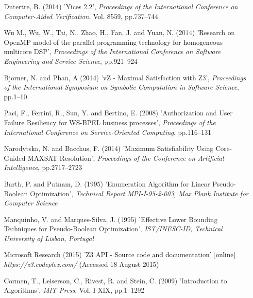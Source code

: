 \documentclass{doublecol-new}
\theoremstyle{TH}{
\newtheorem{lemma}{Lemma}
\newtheorem{theorem}[lemma]{Theorem}
\newtheorem{corrolary}[lemma]{Corrolary}
\newtheorem{conjecture}[lemma]{Conjecture}
\newtheorem{proposition}[lemma]{Proposition}
\newtheorem{claim}[lemma]{Claim}
\newtheorem{stheorem}[lemma]{Wrong Theorem}
\newtheorem{algorithm}{Algorithm}
}
\theoremstyle{THrm}{
\newtheorem{definition}{Definition}[section]
\newtheorem{question}{Question}[section]
\newtheorem{remark}{Remark}
\newtheorem{scheme}{Scheme}
}
\theoremstyle{THhit}{
\newtheorem{case}{Case}[section]
}
\begin{document}
\begin{thebibliography}{10}
Dutertre, B. (2014) 'Yices 2.2', {\it Proceedings of the International Conference on Computer-Aided Verification}, Vol. 8559, pp.737--744

Wu M., Wu, W., Tai, N., Zhao, H., Fan, J. and Yuan, N. (2014) 'Research on OpenMP model of the parallel programming technology for homogeneous multicore DSP', {\it Proceedings of the International Conference on Software Engineering and Service Science}, pp.921--924

Bjorner, N. and Phan, A (2014) 'vZ - Maximal Satisfaction with Z3', {\it Proceedings of the International Symposium on Symbolic Computation in Software Science}, pp.1--10


Paci, F., Ferrini, R., Sun, Y. and Bertino, E. (2008) 'Authorization and User Failure Resiliency for WS-BPEL business processes', {\it Proceedings of the International Conference on Service-Oriented Computing}, pp.116--131

Narodytska, N. and Bacchus, F. (2014) 'Maximum Satisfiability Using Core-Guided MAXSAT Resolution', {\it Proceedings of the Conference on Artificial Intelligence}, pp.2717--2723

Barth, P. and Putnam, D. (1995) 'Enumeration Algorithm for Linear Pseudo-Boolean Optimization', {\it Technical Report MPI-I-95-2-003, Max Plank Institute for Computer Science}

Manquinho, V. and Marques-Silva, J. (1995) 'Effective Lower Bounding Techniques for Pseudo-Boolean Optimization', {\it IST/INESC-ID, Technical University of Lisbon, Portugal}

Microsoft Research (2015) 'Z3 API - Source code and documentation' [online] {\it https://z3.codeplex.com/} (Accessed 18 August 2015)

Cormen, T., Leiserson, C., Rivest, R. and Stein, C. (2009) 'Introduction to Algorithms', {\it MIT Press}, Vol. I-XIX, pp.1--1292


\end{thebibliography}
\end{document}
